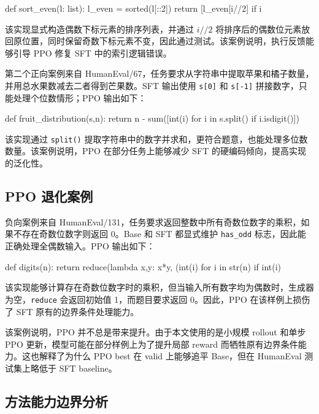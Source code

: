 \begin{codeblock}[language=Python]
def sort_even(l: list):
    l_even = sorted(l[::2])
    return [l_even[i//2] if i%
\end{codeblock}

该实现显式构造偶数下标元素的排序列表，并通过 $i//2$ 将排序后的偶数位元素放回原位置，同时保留奇数下标元素不变，因此通过测试。该案例说明，执行反馈能够引导 PPO 修复 SFT 中的索引逻辑错误。

第二个正向案例来自 HumanEval/67，任务要求从字符串中提取苹果和橘子数量，并用总水果数减去二者得到芒果数。SFT 输出使用 \texttt{s[0]} 和 \texttt{s[-1]} 拼接数字，只能处理个位数情形；PPO 输出如下：

\begin{codeblock}[language=Python]
def fruit_distribution(s,n):
  return n - sum([int(i) for i in s.split() if i.isdigit()])
\end{codeblock}

该实现通过 \texttt{split()} 提取字符串中的数字并求和，更符合题意，也能处理多位数数量。该案例说明，PPO 在部分任务上能够减少 SFT 的硬编码倾向，提高实现的泛化性。

\subsection{PPO 退化案例}

负向案例来自 HumanEval/131，任务要求返回整数中所有奇数位数字的乘积，如果不存在奇数位数字则返回 0。Base 和 SFT 都显式维护 \texttt{has\_odd} 标志，因此能正确处理全偶数输入。PPO 输出如下：

\begin{codeblock}[language=Python]
def digits(n):
  return reduce(lambda x,y: x*y, (int(i) for i in str(n) if int(i)%
\end{codeblock}

该实现能够计算存在奇数位数字时的乘积，但当输入所有数字均为偶数时，生成器为空，\texttt{reduce} 会返回初始值 1，而题目要求返回 0。因此，PPO 在该样例上损伤了 SFT 原有的边界条件处理能力。

该案例说明，PPO 并不总是带来提升。由于本文使用的是小规模 rollout 和单步 PPO 更新，模型可能在部分样例上为了提升局部 reward 而牺牲原有边界条件能力。这也解释了为什么 PPO best 在 valid 上能够追平 Base，但在 HumanEval 测试集上略低于 SFT baseline。

\subsection{方法能力边界分析}


